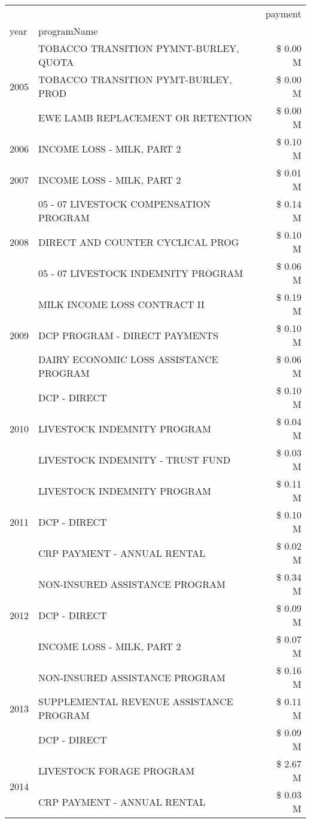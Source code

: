 \begin{tabular}{llr}
\toprule
 &  & payment \\
year & programName &  \\
\midrule
\multirow[t]{3}{*}{2005} & TOBACCO TRANSITION PYMNT-BURLEY, QUOTA & \$ 0.00 M \\
 & TOBACCO TRANSITION PYMT-BURLEY, PROD & \$ 0.00 M \\
 & EWE LAMB REPLACEMENT OR RETENTION & \$ 0.00 M \\
\cline{1-3}
2006 & INCOME LOSS - MILK, PART 2 & \$ 0.10 M \\
\cline{1-3}
2007 & INCOME LOSS - MILK, PART 2 & \$ 0.01 M \\
\cline{1-3}
\multirow[t]{3}{*}{2008} & 05 - 07 LIVESTOCK COMPENSATION PROGRAM & \$ 0.14 M \\
 & DIRECT AND COUNTER CYCLICAL PROG & \$ 0.10 M \\
 & 05 - 07 LIVESTOCK INDEMNITY PROGRAM & \$ 0.06 M \\
\cline{1-3}
\multirow[t]{3}{*}{2009} & MILK INCOME LOSS CONTRACT II & \$ 0.19 M \\
 & DCP PROGRAM - DIRECT PAYMENTS & \$ 0.10 M \\
 & DAIRY ECONOMIC LOSS ASSISTANCE PROGRAM & \$ 0.06 M \\
\cline{1-3}
\multirow[t]{3}{*}{2010} & DCP - DIRECT & \$ 0.10 M \\
 & LIVESTOCK INDEMNITY PROGRAM & \$ 0.04 M \\
 & LIVESTOCK INDEMNITY - TRUST FUND & \$ 0.03 M \\
\cline{1-3}
\multirow[t]{3}{*}{2011} & LIVESTOCK INDEMNITY PROGRAM & \$ 0.11 M \\
 & DCP - DIRECT & \$ 0.10 M \\
 & CRP PAYMENT - ANNUAL RENTAL & \$ 0.02 M \\
\cline{1-3}
\multirow[t]{3}{*}{2012} & NON-INSURED ASSISTANCE PROGRAM & \$ 0.34 M \\
 & DCP - DIRECT & \$ 0.09 M \\
 & INCOME LOSS - MILK, PART 2 & \$ 0.07 M \\
\cline{1-3}
\multirow[t]{3}{*}{2013} & NON-INSURED ASSISTANCE PROGRAM & \$ 0.16 M \\
 & SUPPLEMENTAL REVENUE ASSISTANCE PROGRAM & \$ 0.11 M \\
 & DCP - DIRECT & \$ 0.09 M \\
\cline{1-3}
\multirow[t]{3}{*}{2014} & LIVESTOCK FORAGE PROGRAM & \$ 2.67 M \\
 & CRP PAYMENT - ANNUAL RENTAL & \$ 0.03 M \\

\end{tabular}
